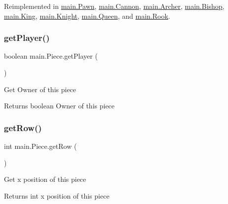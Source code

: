 Reimplemented in \mbox{\hyperlink{classmain_1_1_pawn_a9b2b0585c4109472bff44ee71709ba2d}{main.\+Pawn}}, \mbox{\hyperlink{classmain_1_1_cannon_a7d765ab4a98f0fe7e9f7c8009aedfb35}{main.\+Cannon}}, \mbox{\hyperlink{classmain_1_1_archer_a56a18fea81ee66d4851c35415204a0dd}{main.\+Archer}}, \mbox{\hyperlink{classmain_1_1_bishop_a8fefdb54888dcf7d5093c29645ec2a32}{main.\+Bishop}}, \mbox{\hyperlink{classmain_1_1_king_a22461ffc069a468a22defbf83eb64ca5}{main.\+King}}, \mbox{\hyperlink{classmain_1_1_knight_a78dcdc3357df740c435e8c1b6c66d28f}{main.\+Knight}}, \mbox{\hyperlink{classmain_1_1_queen_a913eb8ceb0191b10a35eb9a5034aae01}{main.\+Queen}}, and \mbox{\hyperlink{classmain_1_1_rook_a33eaf3b77f78846b7d165338d6e7bf52}{main.\+Rook}}.

\mbox{\label{classmain_1_1_piece_afce632cbf2ecedfaffd75b3429cd9171}} 
\subsubsection{\texorpdfstring{getPlayer()}{getPlayer()}}
{\footnotesize\ttfamily boolean main.\+Piece.\+get\+Player (\begin{DoxyParamCaption}{ }\end{DoxyParamCaption})\hspace{0.3cm}{\ttfamily [inline]}}

Get Owner of this piece \begin{DoxyReturn}{Returns}
boolean Owner of this piece 
\end{DoxyReturn}
\mbox{\label{classmain_1_1_piece_ac64b94e395aeccaa7775f64347008942}} 
\subsubsection{\texorpdfstring{getRow()}{getRow()}}
{\footnotesize\ttfamily int main.\+Piece.\+get\+Row (\begin{DoxyParamCaption}{ }\end{DoxyParamCaption})\hspace{0.3cm}{\ttfamily [inline]}}

Get x position of this piece \begin{DoxyReturn}{Returns}
int x position of this piece 
\end{DoxyReturn}
\mbox{\label{classmain_1_1_piece_ac37459803d206ec69e963d8ec80b18ab}} 
